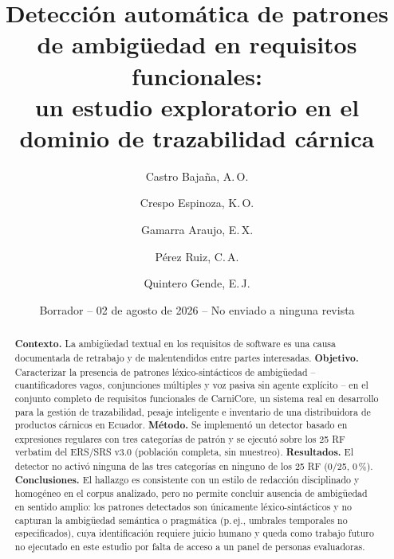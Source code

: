 \documentclass[11pt,a4paper]{article}
\title{\textbf{Detecci\'on autom\'atica de patrones de ambig\"uedad en requisitos funcionales:\\ un estudio exploratorio en el dominio de trazabilidad c\'arnica}}
\author{Castro Baja\~na, A.\,O. \and Crespo Espinoza, K.\,O. \and Gamarra Araujo, E.\,X. \and P\'erez Ruiz, C.\,A. \and Quintero Gende, E.\,J.}
\date{Borrador -- 02 de agosto de 2026 -- No enviado a ninguna revista}
\begin{document}
\maketitle

\begin{center}
\end{center}

\begin{abstract}
\textbf{Contexto.} La ambig\"uedad textual en los requisitos de software es una causa documentada de retrabajo y de malentendidos entre partes interesadas. \textbf{Objetivo.} Caracterizar la presencia de patrones l\'exico-sint\'acticos de ambig\"uedad -- cuantificadores vagos, conjunciones m\'ultiples y voz pasiva sin agente expl\'icito -- en el conjunto completo de requisitos funcionales de CarniCore, un sistema real en desarrollo para la gesti\'on de trazabilidad, pesaje inteligente e inventario de una distribuidora de productos c\'arnicos en Ecuador. \textbf{M\'etodo.} Se implement\'o un detector basado en expresiones regulares con tres categor\'ias de patr\'on y se ejecut\'o sobre los 25 RF verbatim del ERS/SRS v3.0 (poblaci\'on completa, sin muestreo). \textbf{Resultados.} El detector no activ\'o ninguna de las tres categor\'ias en ninguno de los 25 RF (0/25, 0\,\%). \textbf{Conclusiones.} El hallazgo es consistente con un estilo de redacci\'on disciplinado y homog\'eneo en el corpus analizado, pero no permite concluir ausencia de ambig\"uedad en sentido amplio: los patrones detectados son \'unicamente l\'exico-sint\'acticos y no capturan la ambig\"uedad sem\'antica o pragm\'atica (p.\,ej., umbrales temporales no especificados), cuya identificaci\'on requiere juicio humano y queda como trabajo futuro no ejecutado en este estudio por falta de acceso a un panel de personas evaluadoras.
\end{abstract}
\end{document}
